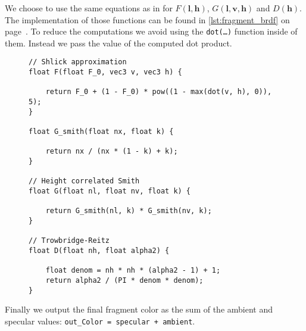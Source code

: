 We choose to use the same equations as in \autocite{karis2013real} for
$F(\textbf{l}, \textbf{h})$, $G(\textbf{l}, \textbf{v}, \textbf{h})$ and
$D(\textbf{h})$. The implementation of those functions can be found in
\autoref{lst:fragment_brdf} on page~\pageref{lst:fragment_brdf}. To reduce the
computations we avoid using the \texttt{dot(\ldots)} function inside of them.
Instead we pass the value of the computed dot product.

\begin{figure}[ht!]
\begin{lstlisting}
// Shlick approximation
float F(float F_0, vec3 v, vec3 h) {

    return F_0 + (1 - F_0) * pow((1 - max(dot(v, h), 0)), 5);
}

float G_smith(float nx, float k) {

    return nx / (nx * (1 - k) + k);
}

// Height correlated Smith
float G(float nl, float nv, float k) {

    return G_smith(nl, k) * G_smith(nv, k);
}

// Trowbridge-Reitz
float D(float nh, float alpha2) {

    float denom = nh * nh * (alpha2 - 1) + 1;
    return alpha2 / (PI * denom * denom);
}
\end{lstlisting}
\end{figure}

Finally we output the final fragment color as the sum of the ambient and
specular values: \texttt{out\_Color = specular + ambient}.

